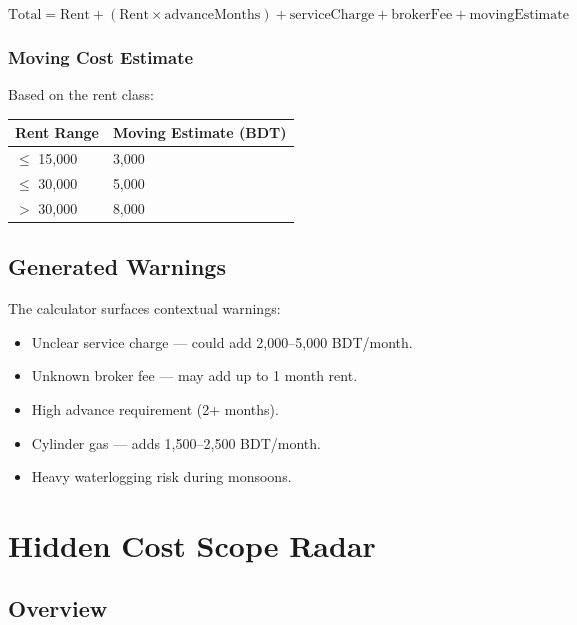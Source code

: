 \documentclass[12pt, a4paper, oneside]{report}
\begin{document}
\begin{equation}
\text{Total} = \text{Rent} + (\text{Rent} \times \text{advanceMonths}) + \text{serviceCharge} + \text{brokerFee} + \text{movingEstimate}
\end{equation}

\subsection{Moving Cost Estimate}

Based on the rent class:

\begin{longtable}{p{4cm} p{4cm}}
\toprule
\textbf{Rent Range} & \textbf{Moving Estimate (BDT)} \\
\midrule
\endhead
$\leq$ 15,000 & 3,000 \\
$\leq$ 30,000 & 5,000 \\
$>$ 30,000 & 8,000 \\
\bottomrule
\end{longtable}

\section{Generated Warnings}

The calculator surfaces contextual warnings:

\begin{itemize}[leftmargin=2em]
  \item Unclear service charge --- could add 2,000--5,000 BDT/month.
  \item Unknown broker fee --- may add up to 1 month rent.
  \item High advance requirement (2+ months).
  \item Cylinder gas --- adds 1,500--2,500 BDT/month.
  \item Heavy waterlogging risk during monsoons.
\end{itemize}


\chapter{Hidden Cost Scope Radar}

\section{Overview}
\end{document}
